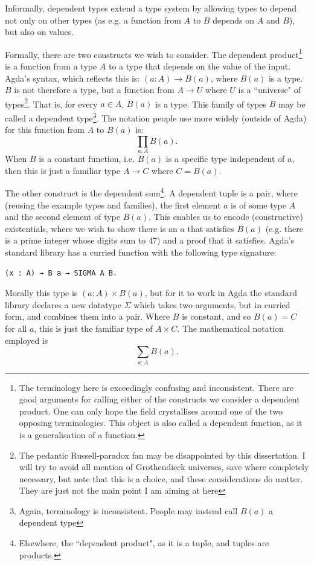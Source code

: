 \documentclass[12pt,a4paper,twoside,openright]{report}
\begin{document}
Informally, dependent types extend a type system by allowing types to depend not only on other types (as e.g. a function from $A$ to $B$ depends on $A$ and $B$), but also on values. 

Formally, there are two constructs we wish to consider. The dependent product\footnote{The terminology here is exceedingly confusing and inconsistent. There are good arguments for calling either of the constructs we consider a dependent product. One can only hope the field crystallises around one of the two opposing terminologies. This object is also called a dependent function, as it is a generalisation of a function.} is a function from a type $A$ to a type that depends on the value of the input. Agda's syntax, which reflects this is: $(a : A) \to B(a)$, where $B(a)$ is a type. $B$ is not therefore a type, but a function from $A \to U$ where $U$ is a ``universe" of types\footnote{The pedantic Russell-paradox fan may be disappointed by this dissertation. I will try to avoid all mention of Grothendieck universes, save where completely necessary, but note that this is a choice, and these considerations do matter. They are just not the main point I am aiming at here}. That is, for every $a \in A$, $B(a)$ is a type. This family of types $B$ may be called a dependent type\footnote{Again, terminology is inconsistent. People may instead call $B(a)$ a dependent type}. The notation people use more widely (outside of Agda) for this function from $A$ to $B(a)$ is:
\[
\prod_{a: A} B(a).
\]
When $B$ is a constant function, i.e. $B(a)$ is a specific type independent of $a$, then this is just a familiar type $A \to C$ where $C = B(a)$.

The other construct is the dependent sum\footnote{Elsewhere, the ``dependent product", as it is a tuple, and tuples are products.}. A dependent tuple is a pair, where (reusing the example types and families), the first element $a$ is of some type $A$ and the second element of type $B(a)$. This enables us to encode (constructive) existentials, where  we wish to show there is an $a$ that satisfies $B(a)$ (e.g. there is a prime integer whose digits sum to 47) and a proof that it satisfies. Agda's standard library has a curried function with the following type signature:
\begin{verbatim}
(x : A) → B a → SIGMA A B.
\end{verbatim} 
Morally this type is $(a : A) \times B(a)$, but for it to work in Agda the standard library declares a new datatype $\Sigma$ which takes two arguments, but in curried form, and combines them into a pair. Where $B$ is constant, and so $B(a) = C$ for all $a$, this is just the familiar type of $A \times C$. The mathematical notation employed is
\[
\sum_{a : A} B(a). 
\]
\end{document}
